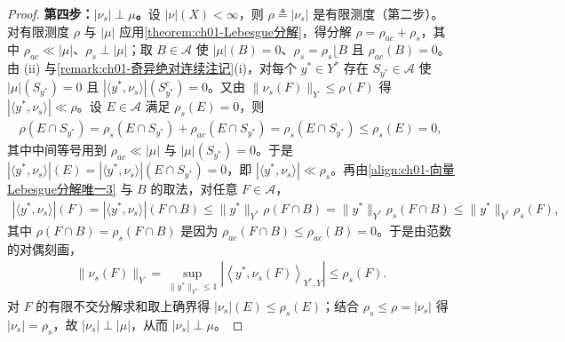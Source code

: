 \documentclass[../../main.tex]{subfiles}%
\begin{document}
\begin{proof}
\textbf{第四步：$|\nu_s|\perp\mu$。}设 $|\nu|(X)<\infty$，则 $\rho\triangleq|\nu_s|$ 是有限测度（第二步）。对有限测度 $\rho$ 与 $|\mu|$ 应用\cref{theorem:ch01-Lebesgue分解}，得分解 $\rho=\rho_{ac}+\rho_s$，其中 $\rho_{ac}\ll|\mu|$、$\rho_s\perp|\mu|$；取 $B\in\mathcal{A}$ 使 $|\mu|(B)=0$、$\rho_s=\rho_s\lfloor B$ 且 $\rho_{ac}(B)=0$。由 (ii) 与\cref{remark:ch01-奇异绝对连续注记}(i)，对每个 $y^*\in Y^*$ 存在 $S_{y^*}\in\mathcal{A}$ 使 $|\mu|(S_{y^*})=0$ 且 $\left|\langle y^*,\nu_s\rangle\right|(S_{y^*}^c)=0$。又由 $\|\nu_s(F)\|_Y\leqslant\rho(F)$ 得 $\left|\langle y^*,\nu_s\rangle\right|\ll\rho$。设 $E\in\mathcal{A}$ 满足 $\rho_s(E)=0$，则
\begin{align*}
\rho(E\cap S_{y^*})=\rho_s(E\cap S_{y^*})+\rho_{ac}(E\cap S_{y^*})=\rho_s(E\cap S_{y^*})\leqslant\rho_s(E)=0,
\end{align*}
其中中间等号用到 $\rho_{ac}\ll|\mu|$ 与 $|\mu|(S_{y^*})=0$。于是 $\left|\langle y^*,\nu_s\rangle\right|(E)=\left|\langle y^*,\nu_s\rangle\right|(E\cap S_{y^*})=0$，即 $\left|\langle y^*,\nu_s\rangle\right|\ll\rho_s$。再由\eqref{align:ch01-向量Lebesgue分解唯一3} 与 $B$ 的取法，对任意 $F\in\mathcal{A}$，
\begin{align*}
\left|\langle y^*,\nu_s\rangle\right|(F)=\left|\langle y^*,\nu_s\rangle\right|(F\cap B)\leqslant\|y^*\|_{Y^*}\rho(F\cap B)=\|y^*\|_{Y^*}\rho_s(F\cap B)\leqslant\|y^*\|_{Y^*}\rho_s(F),
\end{align*}
其中 $\rho(F\cap B)=\rho_s(F\cap B)$ 是因为 $\rho_{ac}(F\cap B)\leqslant\rho_{ac}(B)=0$。于是由范数的对偶刻画，
\begin{align*}
\|\nu_s(F)\|_Y=\sup_{\|y^*\|_{Y^*}\leqslant1}\left|\left\langle y^*,\nu_s(F)\right\rangle_{Y^*,Y}\right|\leqslant\rho_s(F).
\end{align*}
对 $F$ 的有限不交分解求和取上确界得 $|\nu_s|(E)\leqslant\rho_s(E)$；结合 $\rho_s\leqslant\rho=|\nu_s|$ 得 $|\nu_s|=\rho_s$，故 $|\nu_s|\perp|\mu|$，从而 $|\nu_s|\perp\mu$。
\end{proof}
\end{document}

